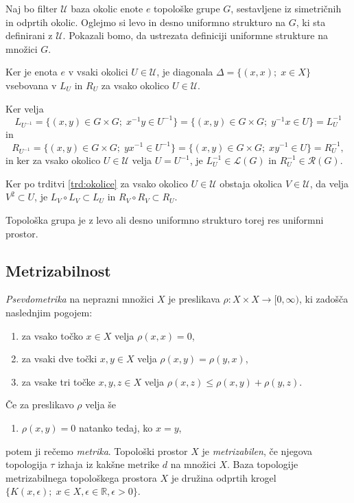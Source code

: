 \documentclass[mat1]{fmfdelo}
\newcommand{\R}{\mathbb R}
\newcommand{\Ucurl}{\mathcal{U}}
\begin{document}
\begin{dokaz}
Naj bo filter $\Ucurl$ baza okolic enote $e$ topološke grupe $G$, sestavljene iz simetričnih in odprtih okolic. Oglejmo si levo in desno uniformno strukturo na $G$, ki sta definirani z $\Ucurl$. Pokazali bomo, da ustrezata definiciji uniformne strukture na množici $G$.

Ker je enota $e$ v vsaki okolici $U \in \Ucurl$, je diagonala $\Delta = \lbrace (x, x) ;\; x \in X \rbrace$ vsebovana v $L_U$ in $R_U$ za vsako okolico $U \in \Ucurl$.

Ker velja \[L_{U^{-1}} = \lbrace (x, y) \in G \times G ;\; x^{-1}y \in U^{-1} \rbrace = \lbrace (x, y) \in G \times G ;\; y^{-1}x \in U \rbrace = L^{-1}_U\]
in
\[R_{U^{-1}} = \lbrace (x, y) \in G \times G ;\; yx^{-1} \in U^{-1} \rbrace = \lbrace (x, y) \in G \times G ;\; xy^{-1} \in U \rbrace = R^{-1}_U,\]
in ker za vsako okolico $U \in \Ucurl$ velja $U = U^{-1}$, je $L^{-1}_U \in \mathcal{L}(G)$ in $R^{-1}_U \in \mathcal{R}(G)$.

Ker po trditvi \ref{trd:okolice} za vsako okolico $U \in \Ucurl$ obstaja okolica $V \in \Ucurl$, da velja $V^2 \subset U$, je $L_V \circ L_V \subset L_U$ in $R_V \circ R_V \subset R_U$.

Topološka grupa je z levo ali desno uniformno strukturo torej res uniformni prostor.
\end{dokaz}

\subsection{Metrizabilnost}
\emph{Psevdometrika} na neprazni množici $X$ je preslikava $\rho\colon X\times X \to  [0, \infty)$, ki zadošča naslednjim pogojem:
\begin{enumerate}
\item za vsako točko $x \in X$ velja $\rho (x, x) = 0$,
\item za vsaki dve točki $x, y \in X$ velja $\rho (x, y) = \rho (y, x)$,
\item za vsake tri točke $x, y, z \in X$ velja $\rho (x, z) \leq \rho (x, y) + \rho (y, z)$.
\end{enumerate}
Če za preslikavo $\rho$ velja še
\begin{enumerate}[resume]
\item $\rho(x,y) = 0$ natanko tedaj, ko $x = y$,
\end{enumerate}
potem ji rečemo \emph{metrika}.
Topološki prostor $X$ je \emph{metrizabilen}, če njegova topologija $\tau$ izhaja iz kakšne metrike $d$ na množici $X$.
Baza topologije metrizabilnega topološkega prostora $X$ je družina odprtih krogel $\lbrace K(x, \epsilon);\; x \in X, \epsilon \in \R, \epsilon > 0 \rbrace$.
\end{document}
